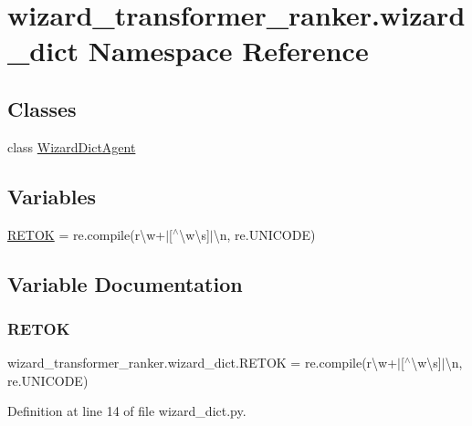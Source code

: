 \hypertarget{namespacewizard__transformer__ranker_1_1wizard__dict}{}\section{wizard\+\_\+transformer\+\_\+ranker.\+wizard\+\_\+dict Namespace Reference}
\label{namespacewizard__transformer__ranker_1_1wizard__dict}
\subsection*{Classes}
\begin{DoxyCompactItemize}
\item 
class \hyperlink{classwizard__transformer__ranker_1_1wizard__dict_1_1WizardDictAgent}{Wizard\+Dict\+Agent}
\end{DoxyCompactItemize}
\subsection*{Variables}
\begin{DoxyCompactItemize}
\item 
\hyperlink{namespacewizard__transformer__ranker_1_1wizard__dict_ad5f210bf55d1fde626ab4af3e29acb61}{R\+E\+T\+OK} = re.\+compile(r\textquotesingle{}\textbackslash{}w+$\vert$\mbox{[}$^\wedge$\textbackslash{}w\textbackslash{}s\mbox{]}$\vert$\textbackslash{}n\textquotesingle{}, re.\+U\+N\+I\+C\+O\+DE)
\end{DoxyCompactItemize}


\subsection{Variable Documentation}
\mbox{\label{namespacewizard__transformer__ranker_1_1wizard__dict_ad5f210bf55d1fde626ab4af3e29acb61}} 
\subsubsection{\texorpdfstring{R\+E\+T\+OK}{RETOK}}
{\footnotesize\ttfamily wizard\+\_\+transformer\+\_\+ranker.\+wizard\+\_\+dict.\+R\+E\+T\+OK = re.\+compile(r\textquotesingle{}\textbackslash{}w+$\vert$\mbox{[}$^\wedge$\textbackslash{}w\textbackslash{}s\mbox{]}$\vert$\textbackslash{}n\textquotesingle{}, re.\+U\+N\+I\+C\+O\+DE)}



Definition at line 14 of file wizard\+\_\+dict.\+py.

